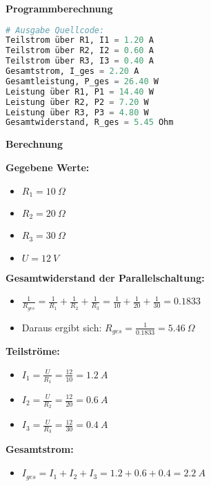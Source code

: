\documentclass[12pt,a4paper]{scrartcl}
\newcommand{\tightlist}{
  \setlength{\itemsep}{0pt}\setlength{\parskip}{0pt}
}
\begin{document}
\textbf{Programmberechnung}

\begin{lstlisting}[language=Python]
# Ausgabe Quellcode:
Teilstrom über R1, I1 = 1.20 A
Teilstrom über R2, I2 = 0.60 A
Teilstrom über R3, I3 = 0.40 A
Gesamtstrom, I_ges = 2.20 A
Gesamtleistung, P_ges = 26.40 W
Leistung über R1, P1 = 14.40 W
Leistung über R2, P2 = 7.20 W
Leistung über R3, P3 = 4.80 W
Gesamtwiderstand, R_ges = 5.45 Ohm
\end{lstlisting}



\newpage

\textbf{Berechnung}

\textbf{Gegebene Werte:}

\begin{itemize}
\tightlist
\item
  \(R_1 = 10~\Omega\)
\item
  \(R_2 = 20~\Omega\)
\item
  \(R_3 = 30~\Omega\)
\item
  \(U = 12~V\)
\end{itemize}

\textbf{Gesamtwiderstand der Parallelschaltung:}

\begin{itemize}
\item
  \(\frac{1}{R_{ges}} = \frac{1}{R_1} + \frac{1}{R_2} + \frac{1}{R_3} = \frac{1}{10} + \frac{1}{20} + \frac{1}{30} = 0.1833\)
\item
  Daraus ergibt sich: \(R_{ges} = \frac{1}{0.1833} = 5.46~\Omega\)
\end{itemize}

\textbf{Teilströme:}

\begin{itemize}
\tightlist
\item
  \(I_1 = \frac{U}{R_1} = \frac{12}{10} = 1.2~A\)
\item
  \(I_2 = \frac{U}{R_2} = \frac{12}{20} = 0.6~A\)
\item
  \(I_3 = \frac{U}{R_3} = \frac{12}{30} = 0.4~A\)
\end{itemize}

\textbf{Gesamtstrom:}

\begin{itemize}
\tightlist
\item
  \(I_{ges} = I_1 + I_2 + I_3 = 1.2 + 0.6 + 0.4 = 2.2~A\)
\end{itemize}
\end{document}
